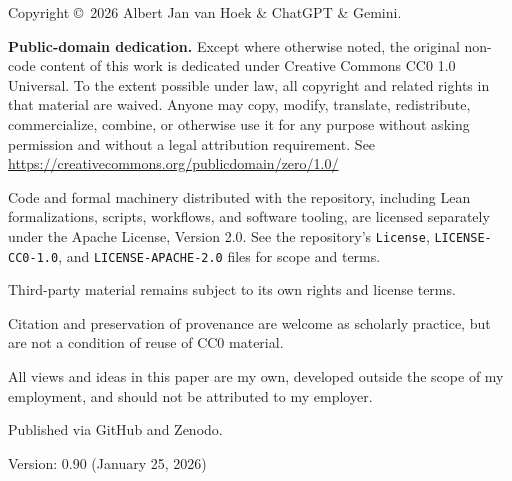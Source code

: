 \newpage
\thispagestyle{empty} %
\vspace*{0.1\textheight} %

\noindent %
Copyright \copyright\ 2026 Albert Jan van Hoek \& ChatGPT \& Gemini.

\bigskip

\noindent
\textbf{Public-domain dedication.} Except where otherwise noted, the original non-code
content of this work is dedicated under Creative Commons CC0 1.0 Universal. To the extent
possible under law, all copyright and related rights in that material are waived. Anyone may
copy, modify, translate, redistribute, commercialize, combine, or otherwise use it for any
purpose without asking permission and without a legal attribution requirement. See\\
\url{https://creativecommons.org/publicdomain/zero/1.0/}

\bigskip
\noindent
Code and formal machinery distributed with the repository, including Lean formalizations,
scripts, workflows, and software tooling, are licensed separately under the Apache License,
Version 2.0. See the repository's \texttt{License}, \texttt{LICENSE-CC0-1.0}, and
\texttt{LICENSE-APACHE-2.0} files for scope and terms.

\bigskip
\noindent
Third-party material remains subject to its own rights and license terms.

\bigskip
\noindent
Citation and preservation of provenance are welcome as scholarly practice, but are not a
condition of reuse of CC0 material.

\bigskip
\noindent
All views and ideas in this paper are my own, developed outside the scope of my employment, and should not be attributed to my employer.

\bigskip
\noindent
Published via GitHub and Zenodo.

\bigskip
\noindent
Version: 0.90 (January 25, 2026)

\vfill
\cleardoublepage
